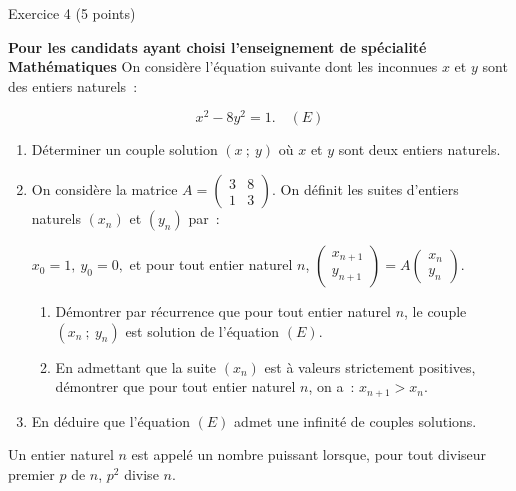
\begin{h2}Exercice 4 (5 points)\end{h2}
\par
\textbf{Pour les candidats ayant choisi l'enseignement de spécialité \og Mathématiques \fg{} }
\bigbreak
{}
\medbreak
On considère l'équation suivante dont les inconnues $x$ et $y$ sont des entiers naturels~:
\par
\[x^2 - 8y^2 = 1 . \quad(E)\]
\medbreak
\begin{enumerate}
     \item Déterminer un couple solution $(x~;~y)$ où $x$ et $y$ sont deux entiers naturels.
     \item  On considère la matrice $A = \begin{pmatrix}3&8\\1&3\end{pmatrix}$.
     On définit les suites d'entiers naturels $\left(x_n\right)$ et $\left(y_n\right)$ par~:
     \par
    \begin{center}
    $x_0 = 1,\: y_0 = 0,$ et pour tout entier naturel $n$, $\begin{pmatrix} x_{n+1}\\y_{n+1}\end{pmatrix} = A\begin{pmatrix}x_{n}\\y_{n}\end{pmatrix}.$
    \end{center}
     \begin{enumerate}[label=\alph*.]
          \item Démontrer par récurrence que pour tout entier naturel $n$, le couple
          $\left(x_n~;~y_n\right)$ est solution de l'équation $(E)$.
          \item En admettant que la suite $\left(x_n\right)$ est à valeurs strictement positives, démontrer que pour tout entier naturel $n$, on a~: $x_{n+1} > x_n$.
     \end{enumerate}
     \item  En déduire que l'équation $(E)$ admet une infinité de couples solutions.
\end{enumerate}
\bigbreak
{}
\medbreak
Un entier naturel $n$ est appelé un nombre puissant lorsque, pour tout diviseur premier $p$ de $n$,\: $p^2$ divise $n$.
\medbreak
